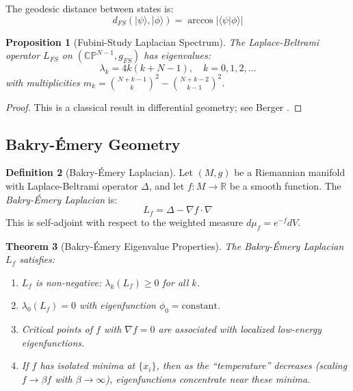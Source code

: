 \documentclass[11pt,a4paper]{article}
\theoremstyle{plain}
\newtheorem{theorem}{Theorem}[section]
\newtheorem{proposition}[theorem]{Proposition}
\theoremstyle{definition}
\newtheorem{definition}[theorem]{Definition}
\theoremstyle{remark}
\newcommand{\R}{\mathbb{R}}
\newcommand{\CP}{\mathbb{CP}}
\newcommand{\ket}[1]{|#1\rangle}
\newcommand{\braket}[2]{\langle#1|#2\rangle}
\begin{document}
The geodesic distance between states is:
\begin{equation}
    d_{FS}(\ket{\psi}, \ket{\phi}) = \arccos|\braket{\psi}{\phi}|
\end{equation}

\begin{proposition}[Fubini-Study Laplacian Spectrum]\label{prop:fs-spectrum}
The Laplace-Beltrami operator $L_{FS}$ on $(\CP^{N-1}, g_{FS})$ has eigenvalues:
\begin{equation}
    \lambda_k = 4k(k + N - 1), \quad k = 0, 1, 2, \ldots
\end{equation}
with multiplicities $m_k = \binom{N+k-1}{k}^2 - \binom{N+k-2}{k-1}^2$.
\end{proposition}

\begin{proof}
This is a classical result in differential geometry; see Berger \cite{berger}.
\end{proof}

\subsection{Bakry-\'Emery Geometry}

\begin{definition}[Bakry-\'Emery Laplacian]\label{def:bakry-emery}
Let $(M, g)$ be a Riemannian manifold with Laplace-Beltrami operator $\Delta$, and let $f : M \to \R$ be a smooth function. The \emph{Bakry-\'Emery Laplacian} is:
\begin{equation}
    L_f = \Delta - \nabla f \cdot \nabla
\end{equation}
This is self-adjoint with respect to the weighted measure $d\mu_f = e^{-f}dV$.
\end{definition}

\begin{theorem}[Bakry-\'Emery Eigenvalue Properties]\label{thm:bakry-emery-props}
The Bakry-\'Emery Laplacian $L_f$ satisfies:
\begin{enumerate}[label=(\roman*),noitemsep]
    \item $L_f$ is non-negative: $\lambda_k(L_f) \geq 0$ for all $k$.
    \item $\lambda_0(L_f) = 0$ with eigenfunction $\phi_0 = \text{constant}$.
    \item Critical points of $f$ with $\nabla f = 0$ are associated with localized low-energy eigenfunctions.
    \item If $f$ has isolated minima at $\{x_i\}$, then as the ``temperature'' decreases (scaling $f \to \beta f$ with $\beta \to \infty$), eigenfunctions concentrate near these minima.
\end{enumerate}
\end{theorem}
\end{document}
